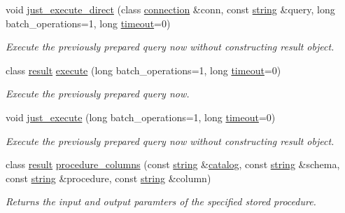 \begin{DoxyCompactItemize}
void \mbox{\hyperlink{classnanodbc_1_1statement_a1e18b1014feb323c346683a331df7adb}{just\+\_\+execute\+\_\+direct}} (class \mbox{\hyperlink{classnanodbc_1_1connection}{connection}} \&conn, const \mbox{\hyperlink{namespacenanodbc_abfc0ece56278e590911ec8352774c212}{string}} \&query, long batch\+\_\+operations=1, long \mbox{\hyperlink{classnanodbc_1_1statement_adbd1acbbdcc529dc668bfef341593573}{timeout}}=0)
\begin{DoxyCompactList}\small\item\em Execute the previously prepared query now without constructing result object. \end{DoxyCompactList}\item 
class \mbox{\hyperlink{classnanodbc_1_1result}{result}} \mbox{\hyperlink{classnanodbc_1_1statement_ab30dac3e4defd5a90181202e99ee8ca5}{execute}} (long batch\+\_\+operations=1, long \mbox{\hyperlink{classnanodbc_1_1statement_adbd1acbbdcc529dc668bfef341593573}{timeout}}=0)
\begin{DoxyCompactList}\small\item\em Execute the previously prepared query now. \end{DoxyCompactList}\item 
void \mbox{\hyperlink{classnanodbc_1_1statement_aef172a65f45487aaeb76c45954b42b75}{just\+\_\+execute}} (long batch\+\_\+operations=1, long \mbox{\hyperlink{classnanodbc_1_1statement_adbd1acbbdcc529dc668bfef341593573}{timeout}}=0)
\begin{DoxyCompactList}\small\item\em Execute the previously prepared query now without constructing result object. \end{DoxyCompactList}\item 
class \mbox{\hyperlink{classnanodbc_1_1result}{result}} \mbox{\hyperlink{classnanodbc_1_1statement_a4b3f414e8bc027db8351e2c59b8239d3}{procedure\+\_\+columns}} (const \mbox{\hyperlink{namespacenanodbc_abfc0ece56278e590911ec8352774c212}{string}} \&\mbox{\hyperlink{classnanodbc_1_1catalog}{catalog}}, const \mbox{\hyperlink{namespacenanodbc_abfc0ece56278e590911ec8352774c212}{string}} \&schema, const \mbox{\hyperlink{namespacenanodbc_abfc0ece56278e590911ec8352774c212}{string}} \&procedure, const \mbox{\hyperlink{namespacenanodbc_abfc0ece56278e590911ec8352774c212}{string}} \&column)
\begin{DoxyCompactList}\small\item\em Returns the input and output paramters of the specified stored procedure. \end{DoxyCompactList}\item 

\end{DoxyCompactItemize}
